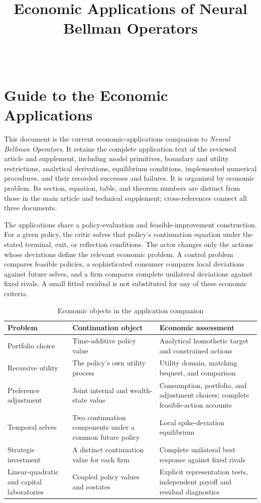 \documentclass[ecta,nameyear,draft]{econsocart}
\theoremstyle{definition}
\theoremstyle{remark}
\begin{document}
\begin{frontmatter}
\title{Economic Applications of Neural Bellman Operators}
\begin{aug}
\author[id=au1,addressref={add1}]{~}
\address[id=add1]{Peking University}
\end{aug}
\end{frontmatter}
\section*{Guide to the Economic Applications}
This document is the current economic-applications companion to \emph{Neural Bellman Operators}. It retains the complete application text of the reviewed article and supplement, including model primitives, boundary and utility restrictions, analytical derivations, equilibrium conditions, implemented numerical procedures, and their recorded successes and failures. It is organized by economic problem. Its section, equation, table, and theorem numbers are distinct from those in the main article and technical supplement; cross-references connect all three documents.

The applications share a policy-evaluation and feasible-improvement construction. For a given policy, the critic solves that policy's continuation equation under the stated terminal, exit, or reflection conditions. The actor changes only the actions whose deviations define the relevant economic problem. A control problem compares feasible policies, a sophisticated consumer compares local deviations against future selves, and a firm compares complete unilateral deviations against fixed rivals. A small fitted residual is not substituted for any of these economic criteria.

\begin{table}[ht]
\centering
\caption{Economic objects in the application companion}
\label{tab:r16applicationsguide}
\begin{tabular}{p{}p{}p{}}
\toprule
Problem & Continuation object & Economic assessment\\
\midrule
Portfolio choice & Time-additive policy value & Analytical homothetic target and constrained actions\\
Recursive utility & The policy's own utility process & Utility domain, matching bequest, and comparison\\
Preference adjustment & Joint internal and wealth-state value & Consumption, portfolio, and adjustment choices; complete feasible-action accounts\\
Temporal selves & Two continuation components under a common future policy & Local spike-deviation equilibrium\\
Strategic investment & A distinct continuation value for each firm & Complete unilateral best response against fixed rivals\\
Linear-quadratic and capital laboratories & Coupled policy values and costates & Explicit representation tests, independent payoff and residual diagnostics\\
\bottomrule
\end{tabular}
\end{table}
\end{document}
